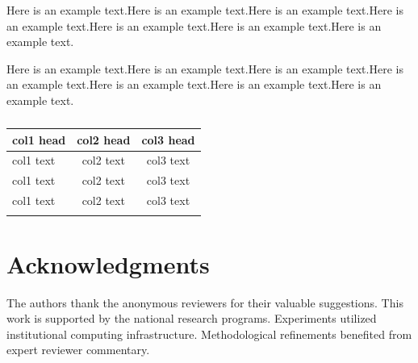 \documentclass[namedate,webpdf,contemporary,large]{TBench-template}%
\theoremstyle{thmstyleone}%
\theoremstyle{thmstyletwo}%
\theoremstyle{thmstylethree}%
\begin{document}
\begin{appendices}
Here is an example text.Here is an example text.Here is an example text.Here is an example text.Here is an example text.Here is an example text.Here is an example text.


Here is an example text.Here is an example text.Here is an example text.Here is an example text.Here is an example text.Here is an example text.Here is an example text.

\begin{table}
\begin{center}
\begin{minipage}{.52\columnwidth}
\caption{}{%
\begin{tabular}{lcc}%
\toprule
col1 head & col2 head & col3 head \\
\midrule
col1 text & col2 text & col3 text \\
col1 text & col2 text & col3 text \\
col1 text & col2 text & col3 text \\
\botrule
\end{tabular}}{}
\end{minipage}
\end{center}
\end{table}

\end{appendices}


\section{Acknowledgments}
The authors thank the anonymous reviewers for their valuable suggestions. This work is supported by the national research programs. Experiments utilized institutional computing infrastructure. Methodological refinements benefited from expert reviewer commentary.



\end{document}
